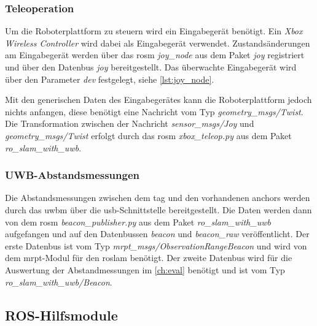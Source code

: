 \subsubsection{Teleoperation}

Um die Roboterplattform zu steuern wird ein Eingabegerät benötigt. Ein \textit{Xbox Wireless Controller} wird dabei als Eingabegerät verwendet. Zustandsänderungen am Eingabegerät werden über das \Gls{rosm} \textit{joy\_node} aus dem Paket \textit{joy} registriert und über den Datenbus \textit{joy} bereitgestellt. Das überwachte Eingabegerät wird über den Parameter \textit{dev} festgelegt, siehe \autoref{lst:joy_node}.

Mit den generischen Daten des Eingabegerätes kann die Roboterplattform jedoch nichts anfangen, diese benötigt eine Nachricht vom Typ \textit{geometry\_msgs/Twist}. Die Transformation zwischen der Nachricht \textit{sensor\_msgs/Joy} und \textit{geometry\_msgs/Twist} erfolgt durch das \Gls{rosm} \textit{xbox\_teleop.py} aus dem Paket \textit{ro\_slam\_with\_uwb}.


\begin{comment}
--------------------------------------------------------------------------------
todo: Nicht Abstandsmessung sondern Entfernungsmessung
\end{comment}
\subsubsection{UWB-Abstandsmessungen}

Die Abstandsmessungen zwischen dem \Gls{tag} und den vorhandenen \Glspl{anchor} werden durch das \Gls{uwbm} über die \Gls{usb}-Schnittstelle bereitgestellt. Die Daten werden dann von dem \Gls{rosm} \textit{beacon\_publisher.py} aus dem Paket \textit{ro\_slam\_with\_uwb} aufgefangen und auf den Datenbussen \textit{beacon} und \textit{beacon\_raw} veröffentlicht. Der erste Datenbus ist vom Typ \textit{mrpt\_msgs/ObservationRangeBeacon} und wird von dem \Gls{mrpt}-Modul für den \Gls{roslam} benötigt. Der zweite Datenbus wird für die Auswertung der Abstandmessungen im \autoref{ch:eval} benötigt und ist vom Typ \textit{ro\_slam\_with\_uwb/Beacon}.


\begin{comment}
--------------------------------------------------------------------------------
\end{comment}
\subsection{ROS-Hilfsmodule}


